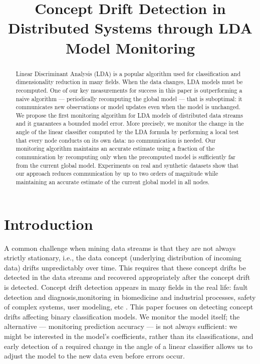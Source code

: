 \documentclass[11pt,twocolumn,varwidth=true,a4paper,fleqn]{article}
\begin{document}
\nocite{*}

\title{Concept Drift Detection in Distributed Systems through LDA
Model Monitoring}
\date{}
\maketitle

\begin{abstract}
Linear Discriminant Analysis (LDA) is a popular algorithm used for
classification and dimensionality reduction in many fields. 
When the data changes, LDA models must be recomputed. 
One of our key measurements for success in this paper is outperforming
a naive algorithm --- periodically recomputing the global model --- that is
suboptimal: it communicates new observations or model updates even when the
model is unchanged.
We propose the first monitoring algorithm for LDA
models of distributed data streams and it guarantees a bounded model error.
More precisely, we monitor the change in the angle of the linear classifier
computed by the LDA formula by performing a local test that every node
conducts on its own data: no communication is needed.
Our monitoring algorithm maintains an accurate estimate using a fraction
of the communication by recomputing only when the precomputed model is 
sufficiently far from the current global model. 
Experiments on real and synthetic datasets show that
our approach reduces communication by up to two orders
of magnitude while maintaining an accurate estimate of the
current global model in all nodes.
\end{abstract}

\section{Introduction}
A common challenge when mining data streams is that
they are not always strictly stationary, i.e., the data
concept (underlying distribution of incoming data) drifts 
unpredictably over time. This requires that these concept drifts be detected 
in the data streams and recovered appropriately after the concept drift 
is detected. 
Concept drift detection appears in many fields in the real life: fault detection and
diagnosis,monitoring in biomedicine and industrial processes,  
safety of complex systems, user modeling, etc \cite{basseville1993detection}.
This paper focuses on detecting concept drifts affecting binary 
classification models.
We monitor the model itself; the alternative --- monitoring prediction
accuracy --- is not always sufficient: we might be interested in the model's
coefficients, rather than its classifications, and early detection of a
required change in the angle of a linear classifier allows us to adjust 
the model to the new data even before errors occur.
\end{document}
